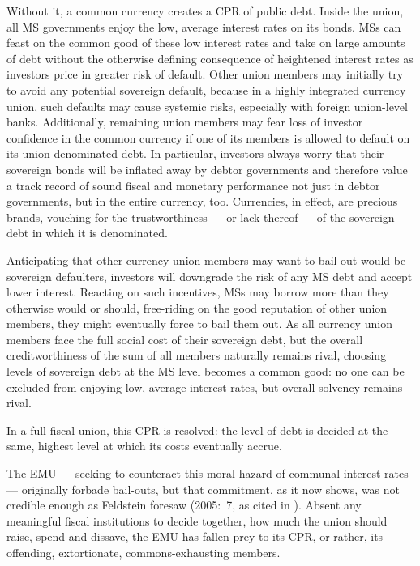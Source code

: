 Without it, a common currency creates a \gls{CPR} of public debt.
Inside the union, all \gls{MS} governments enjoy the low, average interest rates on its bonds.
\glspl{MS} can feast on the common good of these low interest rates and take on large amounts of debt without the otherwise defining consequence of heightened interest rates as investors price in greater risk of default.
Other union members may initially try to avoid any potential sovereign default, because in a highly integrated currency union, such defaults may cause systemic risks, especially with foreign union-level banks.
Additionally, remaining union members may fear loss of investor confidence in the common currency if one of its members is allowed to default on its union-denominated debt.
In particular, investors always worry that their sovereign bonds will be inflated away by debtor governments and therefore value a track record of sound fiscal and monetary performance not just in debtor governments, but in the entire currency, too.
Currencies, in effect, are precious brands, vouching for the trustworthiness --- or lack thereof --- of the sovereign debt in which it is denominated.

Anticipating that other currency union members may want to bail out would-be sovereign defaulters, investors will downgrade the risk of any \gls{MS} debt and accept lower interest.
Reacting on such incentives, \glspl{MS} may borrow more than they otherwise would or should, free-riding on the good reputation of other union members, they might eventually force to bail them out.
As all currency union members face the full social cost of their sovereign debt, but the overall creditworthiness of the sum of all members naturally remains rival, choosing levels of sovereign debt at the \gls{MS} level becomes a common good:
no one can be excluded from enjoying low, average interest rates, but overall solvency remains rival.

In a full fiscal union, this \gls{CPR} is resolved:
the level of debt is decided at the same, highest level at which its costs eventually accrue.

The \gls{EMU} --- seeking to counteract this moral hazard of communal interest rates --- originally forbade bail-outs, but that commitment, as it now shows, was not credible enough as Feldstein foresaw (2005:~7, as cited in \citealt[13]{Begg2008}).
Absent any meaningful fiscal institutions to decide together, how much the union should raise, spend and dissave, the \gls{EMU} has fallen prey to its \gls{CPR}, or rather, its offending, extortionate, commons-exhausting members.

